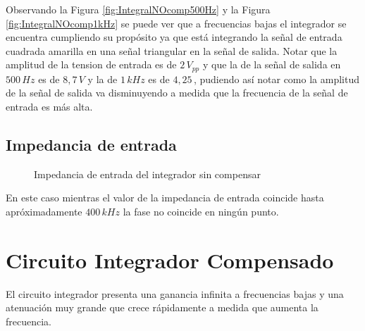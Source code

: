 \documentclass[11pt, a4paper]{article}
\begin{document}
Observando la Figura \ref{fig:IntegralNOcomp500Hz} y la Figura \ref{fig:IntegralNOcomp1kHz} se puede ver que a frecuencias bajas el integrador se encuentra cumpliendo su propósito ya que está integrando la señal de entrada cuadrada amarilla en una señal triangular en la señal de salida. Notar que la amplitud de la tension de entrada es de $2 \, V_{pp}$ y que la de la señal de salida en $500 \,Hz$ es de $8,7 \,V$ y la de $1 \,kHz$ es de $4,25 \,$, pudiendo así notar como la amplitud de la señal de salida va disminuyendo a medida que la frecuencia de la señal de entrada es más alta.

\subsection{Impedancia de entrada}
\begin{figure}[H]
	\begin{center}
		\caption{Impedancia de entrada del integrador sin compensar}
		\label{fig:zinsuperINTegrador}
	\end{center}
\end{figure}

En este caso mientras el valor de la impedancia de entrada coincide hasta apróximadamente $400 \, kHz$ la fase no coincide en ningún punto.


\section{Circuito Integrador Compensado}
El circuito integrador presenta una ganancia infinita a frecuencias bajas y una atenuación muy grande que crece rápidamente a medida que aumenta la frecuencia.
\end{document}
